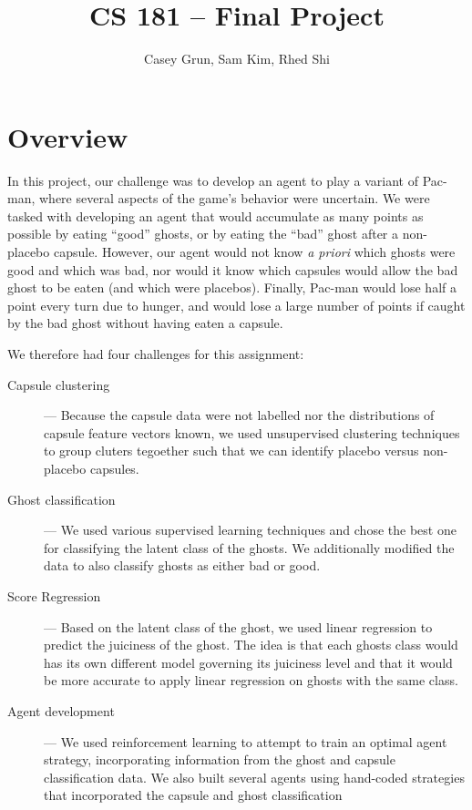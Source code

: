 \documentclass[11pt]{amsart}
\title{CS 181 -- Final Project}
\author{Casey Grun, Sam Kim, Rhed Shi}
\begin{document}
\maketitle

\section{Overview}

In this project, our challenge was to develop an agent to play a variant of Pac-man, where several aspects of the game's behavior were uncertain. We were tasked with developing an agent that would accumulate as many points as possible by eating ``good'' ghosts, or by eating the ``bad'' ghost after a non-placebo capsule. However, our agent would not know \emph{a priori} which ghosts were good and which was bad, nor would it know which capsules would allow the bad ghost to be eaten (and which were placebos). Finally, Pac-man would lose half a point every turn due to hunger, and would lose a large number of points if caught by the bad ghost without having eaten a capsule.

We therefore had four challenges for this assignment:
\begin{description}
	\item[Capsule clustering] --- Because the capsule data were not labelled nor the distributions of capsule feature vectors known, we used unsupervised clustering techniques to group cluters tegoether such that we can identify placebo versus non-placebo capsules.
	\item[Ghost classification] --- We used various supervised learning techniques and chose the best one for classifying the latent class of the ghosts. We additionally modified the data to also classify ghosts as either bad or good.
	\item[Score Regression] --- Based on the latent class of the ghost, we used linear regression to predict the juiciness of the ghost. The idea is that each ghosts class would has its own different model governing its juiciness level and that it would be more accurate to apply linear regression on ghosts with the same class. 
	\item[Agent development] --- We used reinforcement learning to attempt to train an optimal agent strategy, incorporating information from the ghost and capsule classification data. We also built several agents using hand-coded strategies that incorporated the capsule and ghost classification 
\end{description}
\end{document}
